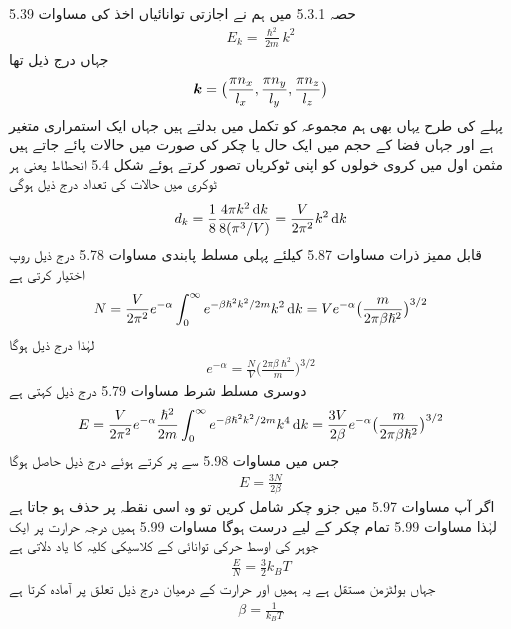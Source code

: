 حصہ 5.3.1 میں ہم نے اجازتی توانائیاں اخذ کی مساوات 5.39 
\begin{align}
E_k = \frac{\hslash^2}{2 m} k^2
\end{align}
جہاں درج ذیل تھا 
\begin{align*}
{\ensuremath{{\boldsymbol{k}}}} = \big ( \frac{\pi n_x}{l_x} , \frac{\pi n_y}{l_y} , \frac{\pi n_z}{l_z} \big )
\end{align*}
پہلے کی طرح یہاں بھی ہم مجموعہ کو تکمل میں بدلتے ہیں جہاں  ایک استمراری متغیر ہے اور جہاں  فضا کے  حجم میں ایک حال یا چکر  کی صورت میں  حالات پائے جاتے ہیں مثمن اول میں کروی خولوں  کو اپنی  ٹوکریاں تصور کرتے ہوئے شکل 5.4 انحطاط یعنی ہر ٹوکری میں حالات کی تعداد درج ذیل ہوگی 
\begin{align}
d_k = \frac{1}{8} \frac{4 \pi k^2 \dif  k}{8 (\pi^3 /V)} = \frac{V}{2 \pi^2} k^2 \dif k
\end{align}
قابل ممیز ذرات مساوات 5.87 کیلئے پہلی مسلط پابندی مساوات 5.78 درج ذیل روپ اختیار کرتی ہے 
\begin{align*}
N = \frac{V}{2 \pi^2} e^{- \alpha} \int_0^{\infty} e^{- \beta \hslash^2 k^2 / 2m} k^2 \dif  k = V e^{- \alpha} \big ( \frac{m}{2 \pi \beta \hslash^2} \big )^{3/2}
\end{align*}
لہٰذا درج ذیل ہوگا 
\begin{align}
e^{- \alpha} = \frac{N}{V} \big ( \frac{2 \pi \beta \hslash^2}{m} \big )^{3/2}
\end{align}
دوسری مسلط شرط مساوات 5.79 درج ذیل کہتی ہے 
\begin{align*}
E = \frac{V}{2 \pi^2} e^{- \alpha} \frac{\hslash^2}{2 m} \int_0^\infty e^{- \beta \hslash^2 k^2 /2m} k^4 \dif k = \frac{3 V}{2 \beta} e^{- \alpha} \big ( \frac{m}{2 \pi \beta \hslash^2} \big )^{3/2}
\end{align*}
جس میں مساوات 5.98 سے  پر کرتے ہوئے درج ذیل حاصل ہوگا 
\begin{align}
E = \frac{3 N}{2 \beta}
\end{align}
اگر آپ مساوات 5.97 میں جزو چکر  شامل کریں تو وہ اسی نقطہ پر حذف ہو جاتا ہے لہٰذا مساوات 5.99 تمام چکر کے لیے درست ہوگا مساوات 5.99 ہمیں درجہ حرارت  پر ایک جوہر کی اوسط حرکی توانائی کے کلاسیکی کلیہ کا یاد دلاتی ہے 
\begin{align}
\frac{E}{N} = \frac{3}{2} k_B T
\end{align}
جہاں  بولٹزمن مستقل ہے یہ ہمیں  اور حرارت کے درمیان درج ذیل تعلق پر آمادہ کرتا ہے 
\begin{align}
\beta = \frac{1}{k_B T}
\end{align}
